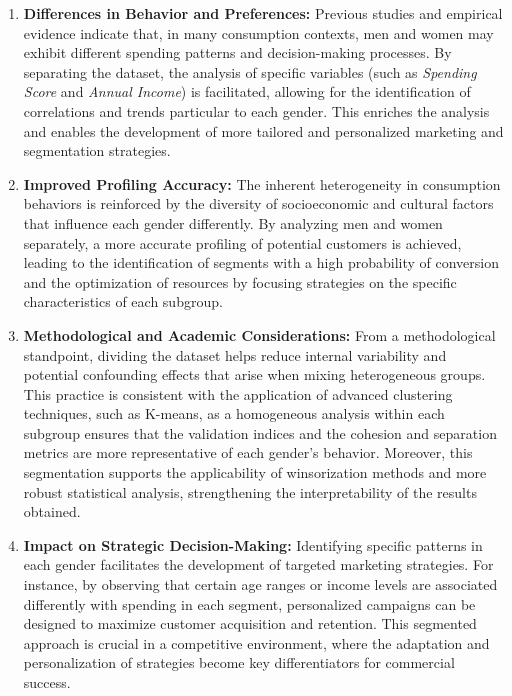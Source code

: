 \documentclass[10pt]{article}
\begin{document}
\begin{enumerate}
    \item \textbf{Differences in Behavior and Preferences:} Previous studies and empirical evidence indicate that, in many consumption contexts, men and women may exhibit different spending patterns and decision-making processes. By separating the dataset, the analysis of specific variables (such as \textit{Spending Score} and \textit{Annual Income}) is facilitated, allowing for the identification of correlations and trends particular to each gender. This enriches the analysis and enables the development of more tailored and personalized marketing and segmentation strategies.
    
    \item \textbf{Improved Profiling Accuracy:} The inherent heterogeneity in consumption behaviors is reinforced by the diversity of socioeconomic and cultural factors that influence each gender differently. By analyzing men and women separately, a more accurate profiling of potential customers is achieved, leading to the identification of segments with a high probability of conversion and the optimization of resources by focusing strategies on the specific characteristics of each subgroup.
    
    \item \textbf{Methodological and Academic Considerations:} From a methodological standpoint, dividing the dataset helps reduce internal variability and potential confounding effects that arise when mixing heterogeneous groups. This practice is consistent with the application of advanced clustering techniques, such as K-means, as a homogeneous analysis within each subgroup ensures that the validation indices and the cohesion and separation metrics are more representative of each gender's behavior. Moreover, this segmentation supports the applicability of winsorization methods and more robust statistical analysis, strengthening the interpretability of the results obtained.
    
    \item \textbf{Impact on Strategic Decision-Making:} Identifying specific patterns in each gender facilitates the development of targeted marketing strategies. For instance, by observing that certain age ranges or income levels are associated differently with spending in each segment, personalized campaigns can be designed to maximize customer acquisition and retention. This segmented approach is crucial in a competitive environment, where the adaptation and personalization of strategies become key differentiators for commercial success.
\end{enumerate}
\end{document}
